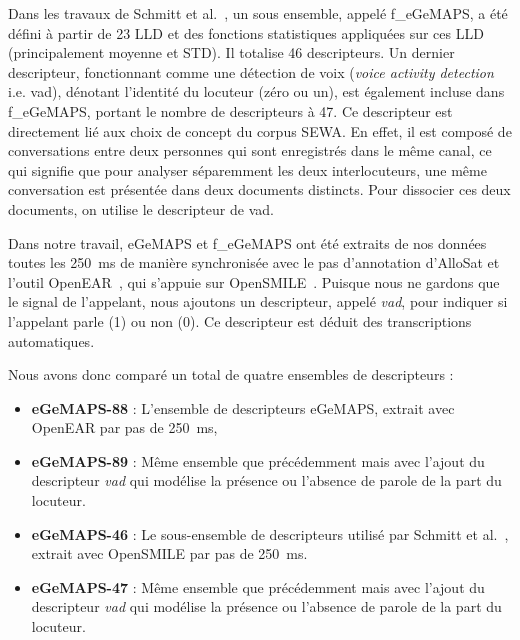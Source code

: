 Dans les travaux de Schmitt et al.~\cite{Schmitt2019}, un sous ensemble, appelé f\_eGeMAPS, a été défini à partir de 23 LLD et des fonctions statistiques appliquées sur ces LLD (principalement moyenne et STD). Il totalise 46 descripteurs. Un dernier descripteur, fonctionnant comme une détection de voix (\textit{voice activity detection} i.e. vad), dénotant l'identité du locuteur (zéro ou un), est également incluse dans f\_eGeMAPS, portant le nombre de descripteurs à 47. Ce descripteur est directement lié aux choix de concept du corpus SEWA. En effet, il est composé de conversations entre deux personnes qui sont enregistrés dans le même canal, ce qui signifie que pour analyser séparemment les deux interlocuteurs, une même conversation est présentée dans deux documents distincts. Pour dissocier ces deux documents, on utilise le descripteur de vad.

Dans notre travail, eGeMAPS et f\_eGeMAPS ont été extraits de nos données toutes les 250~ms de manière synchronisée avec le pas d'annotation d'AlloSat et l'outil OpenEAR~\cite{OpenEAR}, qui s'appuie sur OpenSMILE~\cite{OPENSMILE}. Puisque nous ne gardons que le signal de l'appelant, nous ajoutons un descripteur, appelé \textit{vad}, pour indiquer si l'appelant parle (1) ou non (0). Ce descripteur est déduit des transcriptions automatiques.

Nous avons donc comparé un total de quatre ensembles de descripteurs :
\begin{itemize}
    \item \textbf{eGeMAPS-88} : L'ensemble de descripteurs eGeMAPS, extrait avec OpenEAR par pas de 250~ms,
    \item \textbf{eGeMAPS-89} : Même ensemble que précédemment mais avec l'ajout du descripteur \textit{vad} qui modélise la présence ou l'absence de parole de la part du locuteur.
    \item \textbf{eGeMAPS-46} : Le sous-ensemble de descripteurs utilisé par Schmitt et al.~\cite{Schmitt2019}, extrait avec OpenSMILE par pas de 250~ms.
    \item \textbf{eGeMAPS-47} : Même ensemble que précédemment mais avec l'ajout du descripteur \textit{vad} qui modélise la présence ou l'absence de parole de la part du locuteur.
\end{itemize}

